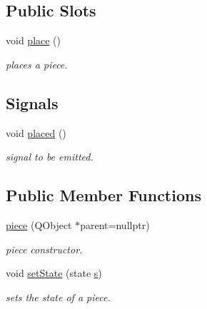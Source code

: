 \subsection*{Public Slots}
\begin{DoxyCompactItemize}
\item 
void \hyperlink{classpiece_a8db42fa9c9e1b03f3a68f238546ab239}{place} ()
\begin{DoxyCompactList}\small\item\em places a piece. \end{DoxyCompactList}\end{DoxyCompactItemize}
\subsection*{Signals}
\begin{DoxyCompactItemize}
\item 
void \hyperlink{classpiece_a57ea505efe23d31353611198296a5a5a}{placed} ()
\begin{DoxyCompactList}\small\item\em signal to be emitted. \end{DoxyCompactList}\end{DoxyCompactItemize}
\subsection*{Public Member Functions}
\begin{DoxyCompactItemize}
\item 
\hyperlink{classpiece_a65fb95a430bc20242a04556dc1d8bd65}{piece} (Q\+Object $\ast$parent=nullptr)
\begin{DoxyCompactList}\small\item\em piece constructor. \end{DoxyCompactList}\item 
void \hyperlink{classpiece_a899f04d950ea038a6784cba40a1e4289}{set\+State} (state \hyperlink{classpiece_abefadbf9b67a599b3aef7c6fcb731365}{s})
\begin{DoxyCompactList}\small\item\em sets the state of a piece. \end{DoxyCompactList}\end{DoxyCompactItemize}
